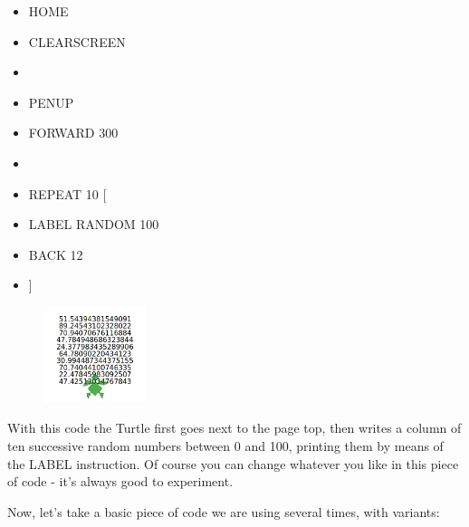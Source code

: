 \begin{scriptsize}
\begin{minipage}{0.50\textwidth}
\begin{itemize}[itemsep=-3pt,parsep=2pt, leftmargin=-0.0mm ]
\item[] HOME
\item[] CLEARSCREEN
\item[]
\item[] PENUP
\item[] FORWARD 300
\item[]
\item[] REPEAT 10 [
\item[] \hspace{8pt} LABEL RANDOM 100
\item[] \hspace{8pt} BACK 12
\item[] ]
\end{itemize}
\end{minipage}
\end{scriptsize}
\begin{minipage}{0.5\textwidth}
\begin{figure}[H]
\includegraphics[width=3.0cm,trim=4 4 8 4,clip]{./images/caos-della-vita/caos-della-vita-1.png}
\label{dec-2}
\end{figure}
\end{minipage} \hfill

\vskip 1cm

With this code the Turtle first goes next to the page top, then writes a column of ten successive random numbers between 0 and 100, printing them by means of the LABEL instruction. Of course you can change whatever you like in this piece of code - it's always good to experiment.

Now, let's take a basic piece of code we are using several times, with variants:

\vskip 1cm

